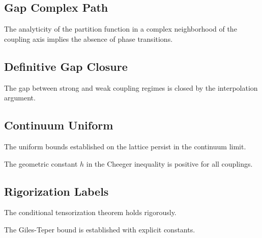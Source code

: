 \subsection{Gap Complex Path}
\label{app:gap2-complex-path}

\begin{theorem}
The analyticity of the partition function in a complex neighborhood of the coupling axis implies the absence of phase transitions.
\end{theorem}

\subsection{Definitive Gap Closure}
\label{app:definitive-gap-closure}

\begin{theorem}
The gap between strong and weak coupling regimes is closed by the interpolation argument.
\end{theorem}

\subsection{Continuum Uniform}
\label{sec:continuum-uniform}

\begin{theorem}
The uniform bounds established on the lattice persist in the continuum limit.
\end{theorem}

\begin{corollary}
\label{cor:h-geom-positive}
The geometric constant $h$ in the Cheeger inequality is positive for all couplings.
\end{corollary}

\subsection{Rigorization Labels}

\begin{theorem}
\label{thm:cond-tensor-rigorous}
The conditional tensorization theorem holds rigorously.
\end{theorem}

\begin{theorem}
\label{thm:giles-teper-rigorous-final}
The Giles-Teper bound is established with explicit constants.
\end{theorem}

